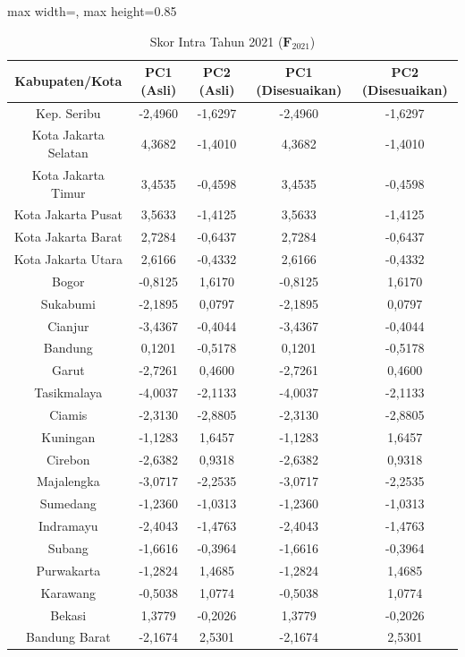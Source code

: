 \begin{table}[H]
\centering
\caption{Skor Intra Tahun 2021 ($\mathbf{F}_{2021}$)} \label{tab:app1skor_intra_2021}
\begin{adjustbox}{max width=\textwidth, max height=0.85\textheight}
\begin{tabular}{|c|c|c|c|c|}
\hline
\textbf{Kabupaten/Kota} & \textbf{PC1 (Asli)} & \textbf{PC2 (Asli)} & \textbf{PC1 (Disesuaikan)} & \textbf{PC2 (Disesuaikan)} \\
\hline
Kep. Seribu & -2,4960 & -1,6297 & -2,4960 & -1,6297 \\
Kota Jakarta Selatan & 4,3682 & -1,4010 & 4,3682 & -1,4010 \\
Kota Jakarta Timur & 3,4535 & -0,4598 & 3,4535 & -0,4598 \\
Kota Jakarta Pusat & 3,5633 & -1,4125 & 3,5633 & -1,4125 \\
Kota Jakarta Barat & 2,7284 & -0,6437 & 2,7284 & -0,6437 \\
Kota Jakarta Utara & 2,6166 & -0,4332 & 2,6166 & -0,4332 \\
Bogor & -0,8125 & 1,6170 & -0,8125 & 1,6170 \\
Sukabumi & -2,1895 & 0,0797 & -2,1895 & 0,0797 \\
Cianjur & -3,4367 & -0,4044 & -3,4367 & -0,4044 \\
Bandung & 0,1201 & -0,5178 & 0,1201 & -0,5178 \\
Garut & -2,7261 & 0,4600 & -2,7261 & 0,4600 \\
Tasikmalaya & -4,0037 & -2,1133 & -4,0037 & -2,1133 \\
Ciamis & -2,3130 & -2,8805 & -2,3130 & -2,8805 \\
Kuningan & -1,1283 & 1,6457 & -1,1283 & 1,6457 \\
Cirebon & -2,6382 & 0,9318 & -2,6382 & 0,9318 \\
Majalengka & -3,0717 & -2,2535 & -3,0717 & -2,2535 \\
Sumedang & -1,2360 & -1,0313 & -1,2360 & -1,0313 \\
Indramayu & -2,4043 & -1,4763 & -2,4043 & -1,4763 \\
Subang & -1,6616 & -0,3964 & -1,6616 & -0,3964 \\
Purwakarta & -1,2824 & 1,4685 & -1,2824 & 1,4685 \\
Karawang & -0,5038 & 1,0774 & -0,5038 & 1,0774 \\
Bekasi & 1,3779 & -0,2026 & 1,3779 & -0,2026 \\
Bandung Barat & -2,1674 & 2,5301 & -2,1674 & 2,5301 \\

\end{tabular}
\end{adjustbox}
\end{table}
